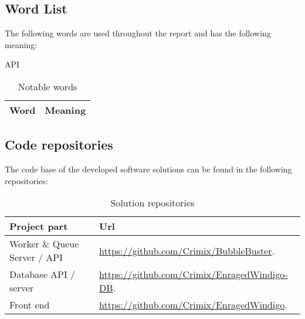 \subsection{Word List}
The following words are used throughout the report and has the following
meaning:

\begin{table}[H]
\centering
API
\begin{tabular}{|l|p{6cm}|}
\hline
\textbf{Word} & \textbf{Meaning} \\ \hline

\end{tabular}
\caption{Notable words}
\end{table}

\subsection{Code repositories}
The code base of the developed software solutions can be found in the following
repositories:

\begin{table}[H]
\centering
\begin{tabular}{|l|p{6cm}|}
\hline
\textbf{Project part} & \textbf{Url} \\ \hline
Worker \& Queue Server / \acs{API}  & \url{https://github.com/Crimix/BubbleBuster}.\\\hline 
Database \acs{API} / server & \url{https://github.com/Crimix/EnragedWindigo-DB}.\\\hline 
Front end & \url{https://github.com/Crimix/EnragedWindigo}.
\\\hline
\end{tabular}
\caption{Solution repositories}
\end{table}